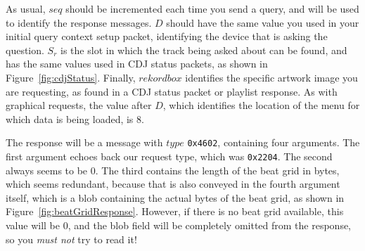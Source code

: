 \documentclass[11pt]{article}
\begin{document}
As usual, $seq$ should be incremented each time you send a query, and
will be used to identify the response messages. $D$ should have the
same value you used in your initial query context setup packet,
identifying the device that is asking the question. $S_r$ is the slot
in which the track being asked about can be found, and has the same
values used in CDJ status packets, as shown in
Figure~\ref{fig:cdjStatus}. Finally, $rekordbox$ identifies the
specific artwork image you are requesting, as found in a CDJ status
packet or playlist response. As with graphical requests, the value
after $D$, which identifies the location of the menu for which data is
being loaded, is 8.

The response will be a message with $type$ {\tt 0x4602}, containing
four arguments. The first argument echoes back our request type, which
was {\tt 0x2204}. The second always seems to be 0. The third contains
the length of the beat grid in bytes, which seems redundant, because
that is also conveyed in the fourth argument itself, which is a blob
containing the actual bytes of the beat grid, as shown in
Figure~\ref{fig:beatGridResponse}. However, if there is no beat grid
available, this value will be 0, and the blob field will be completely
omitted from the response, so you \emph{must not} try to read it!
\end{document}
